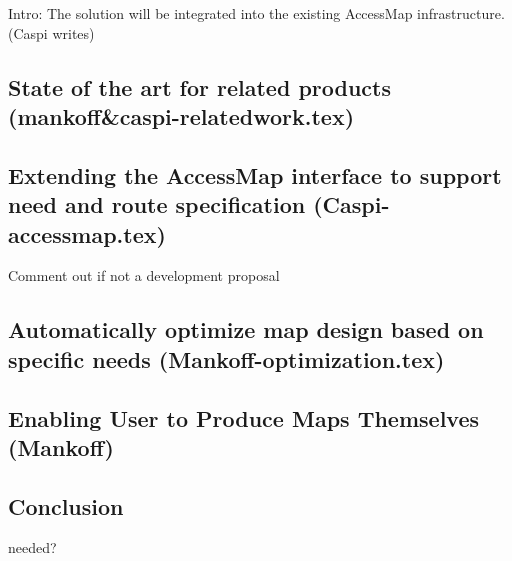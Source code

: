 Intro: The solution will be integrated into the existing AccessMap infrastructure.
(Caspi writes)


\subsection{State of the art for related products (mankoff&caspi-relatedwork.tex)}


\subsection{Extending the AccessMap interface to support need and route specification (Caspi-accessmap.tex)}

Comment out if not a development proposal
\subsection{Automatically optimize map design based on specific needs (Mankoff-optimization.tex)}

\subsection{Enabling User to Produce Maps Themselves (Mankoff)}


\subsection{Conclusion}
needed?